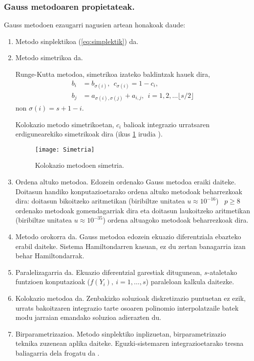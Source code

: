 \subsubsection*{Gauss metodoaren propietateak.}

Gauss metodoen ezaugarri nagusien artean honakoak daude:  
\begin{enumerate}
\item{Metodo sinplektikoa (\ref{eq:simplektik})} da. 
 
\item{Metodo simetrikoa da.}

Runge-Kutta metodoa, simetrikoa izateko baldintzak hauek dira,
\begin{align*}
\label {eq:2}
 b_{i} &= b_{\sigma(i)} ,\ \  c_{\sigma(i)}= 1-c_{i}, \\
 b_{j} &= a_{\sigma(i),\sigma(j)}+a_{i,j}, \ \  i=1,2,\dots \lfloor s/2\rfloor
 \end{align*} 
non $\sigma(i)=s+1-i$.

Kolokazio metodo simetrikoetan, $c_i$ balioak integrazio urratsaren erdigunearekiko simetrikoak dira (ikus \ref{fig:simetrikoa} irudia  ).  
 \begin{figure}[h]
 \centering
 \texttt{[image: Simetria]}
 \caption{ \small Kolokazio metodoen simetria.}
 \label{fig:simetrikoa}
 \end{figure}
 
\item{Ordena altuko metodoa.}
Edozein ordenako Gauss metodoa eraiki daiteke. Doitasun handiko konputazioetarako ordena altuko metodoak beharrezkoak dira: doitasun bikoitzeko aritmetikan (biribiltze unitatea $u\approx10^{-16}$) ~$p\geqslant8$ ordenako metodoak gomendagarriak dira eta doitasun laukoitzeko aritmetikan (biribiltze unitatea $u\approx10^{-35}$) ordena altuagoko metodoak beharrezkoak dira.  

\item{Metodo orokorra da.}
Gauss metodoa edozein ekuazio diferentziala ebazteko erabil daiteke. Sistema Hamiltondarren kasuan, ez du zertan banagarria izan behar Hamiltondarrak.

\item{Paralelizagarria da.}
Ekuazio diferentzial garestiak ditugunean, $s$-ataletako funtzioen konputazioak ($f(Y_i), \ i=1,\dots,s$) paraleloan kalkula daitezke.  

\item{Kolokazio metodoa da.}
Zenbakizko soluzioak diskretizazio puntuetan ez ezik, urrats bakoitzaren integrazio tarte osoaren polinomio interpolatzaile batek modu jarraian emandako soluzioa adierazten du.


\item{Birparametrizazioa.}
Metodo sinplektiko inplizuetan, birparametrizazio teknika zuzenean aplika daiteke. Eguzki-sistemaren integrazioetarako tresna baliagarria dela frogatu da \cite{Fukushima2007}. 
  
\end{enumerate}

